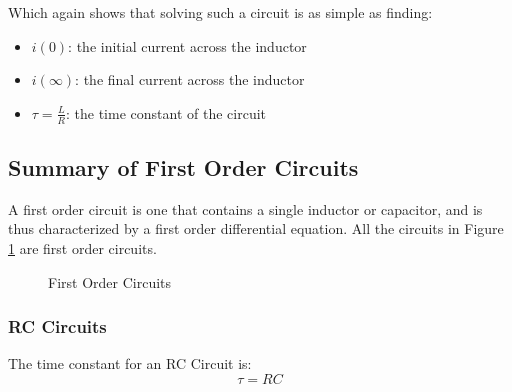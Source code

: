 \documentclass[12pt]{article}
\begin{document}
Which again shows that solving such a circuit is as simple as finding:
\begin{itemize}
  \itemsep0em
  \item $i(0)$: the initial current across the inductor
  \item $i(\infty)$: the final current across the inductor
  \item $\tau=\frac{L}{R}$: the time constant of the circuit
\end{itemize}

\subsection{Summary of First Order Circuits}
\label{ssec:summaryOfFirstOrderCircuits}

A first order circuit is one that contains a single inductor or capacitor, and is thus characterized by a first order differential equation. All the circuits in Figure \ref{fig:firstOrderCircuits} are first order circuits.

\begin{figure}[H]
  \centering
  \begin{subfigure}[H]{0.22\textwidth}
    \centering
    
  \end{subfigure}
  \begin{subfigure}[H]{0.22\textwidth}
    \centering
    
  \end{subfigure}
  \begin{subfigure}[H]{0.22\textwidth}
    \centering
    
  \end{subfigure}
  \begin{subfigure}[H]{0.22\textwidth}
    \centering
    
  \end{subfigure}
  \caption{First Order Circuits}
  \label{fig:firstOrderCircuits}
\end{figure}

\subsubsection{RC Circuits}
\label{sssec:rcCircuitsSummary}

The time constant for an RC Circuit is:
\begin{equation*}
  \tau = RC
\end{equation*}
\end{document}
